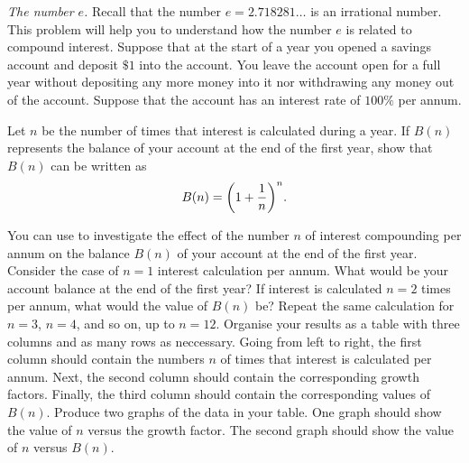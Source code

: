 \documentclass[a4paper,oneside,12pt]{article}
\begin{document}
\begin{problem}
\item\label{prob:exponential:number_e}
  \emph{The number $e$.}
  Recall that the number $e = 2.718281\dots$ is an irrational number.
  This problem will help you to understand how the number $e$ is
  related to compound interest.  Suppose that at the start of a year
  you opened a savings account and deposit $\$1$ into the account.
  You leave the account open for a full year without depositing any
  more money into it nor withdrawing any money out of the account.
  Suppose that the account has an interest rate of $100\%$ per annum.
  \begin{packedenum}
  \item\label{subprob:e_balance_formula}
    Let $n$ be the number of times that interest is calculated during
    a year.  If $B(n)$ represents the balance of your account at the
    end of the first year, show that $B(n)$ can be written as
    \begin{equation}
    \label{eqn:e_savings_first_year_n_compounding}
    B(n)
    =
    \parenthesis*{
      1 + \frac{1}{n}
    }^n.
    \end{equation}

  \item\label{subprob:e_balance_up_to_12_compounding}
    You can use  to
    investigate the effect of the number $n$ of interest compounding
    per annum on the balance $B(n)$ of your account at the end of the
    first year.  Consider the case of $n = 1$ interest calculation per
    annum.  What would be your account balance at the end of the first
    year?  If interest is calculated $n = 2$ times per annum, what
    would the value of $B(n)$ be?  Repeat the same calculation for
    $n = 3$, $n = 4$, and so on, up to $n = 12$.  Organise your
    results as a table with three columns and as many rows as
    neccessary.  Going from left to right, the first column should
    contain the numbers $n$ of times that interest is calculated per
    annum.  Next, the second column should contain the corresponding
    growth factors.  Finally, the third column should contain the
    corresponding values of $B(n)$.  Produce two graphs of the data in
    your table.  One graph should show the value of $n$ versus the
    growth factor.  The second graph should show the value of $n$
    versus $B(n)$.


\end{packedenum}
\end{problem}
\end{document}

